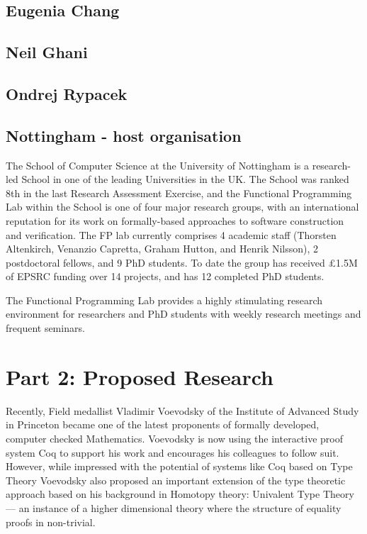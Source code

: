 \documentclass[a4paper]{article}
\renewcommand{\cite}[1]{{\tt[#1]}}
\newcommand{\citetrack}[1]{\cite{#1}}
\begin{document}
\subsection*{Eugenia Chang}

\subsection*{Neil Ghani}

\subsection*{Ondrej Rypacek}


\subsection*{Nottingham - host organisation}

The School of Computer Science at the University of Nottingham
is a research-led School in one of the leading Universities in
the UK.	 The School was ranked 8th in the last Research Assessment
Exercise, and the Functional Programming Lab within the School is
one of four major research groups, with an international reputation
for its work on formally-based approaches to software construction
and verification.  The FP lab currently comprises 4 academic staff
(Thorsten Altenkirch, Venanzio Capretta, Graham Hutton, and Henrik
Nilsson), 2 postdoctoral fellows, and 9 PhD students.  To date the
group has received \pounds 1.5M of EPSRC funding over 14 projects,
and has 12 completed PhD students.

The Functional Programming Lab provides a highly stimulating
research environment for researchers and PhD students with weekly
research meetings and frequent seminars. 



\newpage

\section*{Part 2: Proposed Research}

Recently, Field medallist Vladimir Voevodsky of the Institute of
Advanced Study in Princeton became one of the latest proponents of
formally developed, computer checked Mathematics. Voevodsky is now
using the interactive proof system Coq to support his work and
encourages his colleagues to follow suit. However, while impressed
with the potential of systems like Coq based on Type Theory Voevodsky
also proposed an important extension of the type theoretic approach
based on his background in Homotopy theory: Univalent Type Theory ---
an instance of a higher dimensional theory where the structure of
equality proofs in non-trivial.
\end{document}

